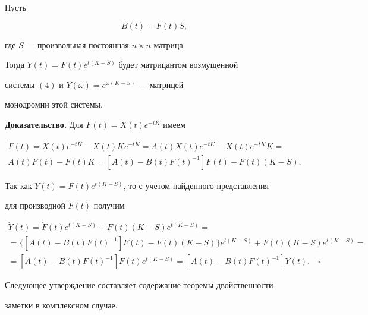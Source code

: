 \begin{lem} Пусть 


\begin{equation}


B(t)=F(t)S,


\end{equation}


где $S$ --- произвольная постоянная $n\times n$-матрица.


Тогда $Y(t)=F(t)e^{t(K-S)}$ будет матрицантом возмущенной


системы $(4)$ и $Y(\omega)=e^{\omega(K-S)}$ --- матрицей


монодромии этой системы.


\end{lem}





{\bf Доказательство.} Для $F(t)=X(t)e^{-tK}$ имеем


\begin{multline*}


\Dot F(t)=\Dot X(t)e^{-tK}-X(t)Ke^{-tK}=A(t)X(t)e^{-tK}-X(t)e^{-tK}K= \\


A(t)F(t)-F(t)K=[A(t)-B(t)F(t)^{-1}]F(t)-F(t)(K-S).


\end{multline*}


Так как $Y(t)=F(t)e^{t(K-S)}$, то с учетом найденного представления


для производной $\Dot F(t)$ получим


\begin{multline*}


\Dot Y(t)=\Dot F(t)e^{t(K-S)}+F(t)(K-S)e^{t(K-S)}= \\


=\{[A(t)-B(t)F(t)^{-1}]F(t)-F(t)(K-S)\}e^{t(K-S)}+F(t)(K-S)e^{t(K-S)}= \\


=[A(t)-B(t)F(t)^{-1}]F(t)e^{t(K-S)}=[A(t)-B(t)F(t)^{-1}]Y(t).


\quad\square


\end{multline*}





Следующее утверждение составляет содержание теоремы двойственности


заметки \cite{3} в комплексном случае.





